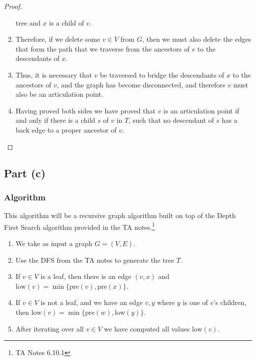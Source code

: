 \documentclass{article}
\begin{document}
\begin{proof}
\begin{enumerate}
                  tree and \(x\) is a child of \(v\).
            \item Therefore, if we delete some \(v \in V\) from \(G\), then we must also
                  delete the edges that form the path that we traverse from the ancestors of
                  \(v\) to the descendants of \(x\).
            \item Thus, it is necessary that \(v\) be traversed to bridge the descendants
                  of \(x\) to the ancestors of \(v\), and the graph has become disconnected, and
                  therefore \(v\) must also be an articulation point.
            \item Having proved both sides we have proved that \(v\) is an articulation point if and only if there is a child \(s\) of
                  \(v\) in \(T\), such that no descendant of \(s\) has a back edge to a proper ancestor of \(v\).
      \end{enumerate}
\end{proof}

\subsection{Part (c)}
\subsubsection{Algorithm}
This algorithm will be a recursive graph algorithm built on top of the Depth First Search
algorithm provided in the TA notes.\footnote{TA Notes 6.10.1}
\begin{enumerate}
      \item We take as input a graph \(G = (V, E)\).
      \item Use the DFS from the TA notes to generate the tree \(T\).
      \item If \(v \in V\) is a leaf, then there is an edge \((v,x)\) and \(\text{low}(v)
            = \min{ \{\text{pre}(v), \text{pre}(x) \} } \).
      \item If \(v \in V\) is not a leaf, and we have an edge \(v, y\) where \(y\) is one
            of \(v\)'s children, then \(\text{low}(v) = \min{ \{ \text{pre}(w) ,
                  \text{low}(y) \} }\).
      \item After iterating over all \(v \in V \) we have computed all values \(\text{low}(v)\).
\end{enumerate}
\end{document}
